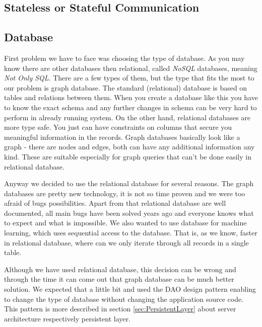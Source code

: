 \subsection{Stateless or Stateful Communication}



\subsection{Database}


First problem we have to face was choosing the type of database. As you may know there are other databases then relational, called \emph{NoSQL} databases, meaning \emph{Not Only SQL}. There are a few types of them, but the type that fits the most to our problem is graph database. The standard (relational) database is based on tables and relations between them. When you create a database like this you have to know the exact schema and any further changes in schema can be very hard to perform in already running system. On the other hand, relational databases are more type safe. You just can have constraints on columns that secure you meaningful information in the records. Graph databases basically look like a graph - there are nodes and edges, both can have any additional information any kind. These are suitable especially for graph queries that can't be done easily in relational database.

Anyway we decided to use the relational database for several reasons.
The graph databases are pretty new technology, it is not so time proven and we were too afraid of bugs possibilities. Apart from that relational database are well documented, all main bugs have been solved years ago and everyone knows what to expect and what is impossible.
We also wanted to use database for machine learning, which uses sequential access to the database. That is, as we know, faster in relational database, where can we only iterate through all records in a single table.

Although we have used relational database, this decision can be wrong and through the time it can come out that graph database can be much better solution. We expected that a little bit and used the DAO design pattern enabling to change the type of database without changing the application source code. This pattern is more described in section \ref{sec:PersistentLayer} about server architecture respectively persistent layer.

